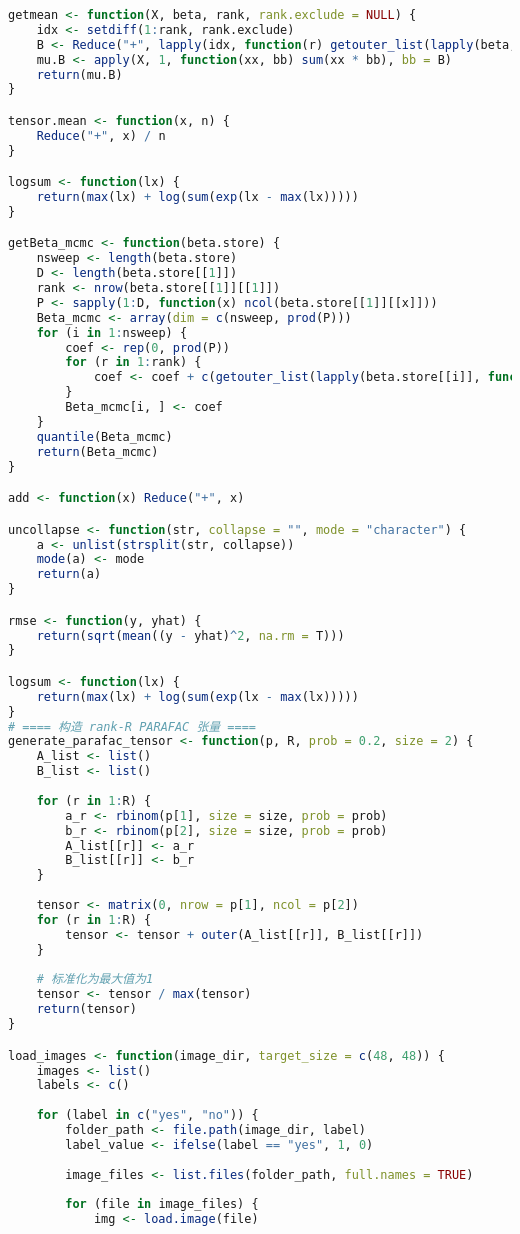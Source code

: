 \documentclass[AutoFakeBold]{LZUThesis}
\begin{document}
\begin{lstlisting}[language = R, caption = {BT-LR}算法]
getmean <- function(X, beta, rank, rank.exclude = NULL) {
	idx <- setdiff(1:rank, rank.exclude)
	B <- Reduce("+", lapply(idx, function(r) getouter_list(lapply(beta, function(x) x[r, ]))))
	mu.B <- apply(X, 1, function(xx, bb) sum(xx * bb), bb = B)
	return(mu.B)
}

tensor.mean <- function(x, n) {
	Reduce("+", x) / n
}

logsum <- function(lx) {
	return(max(lx) + log(sum(exp(lx - max(lx)))))
}

getBeta_mcmc <- function(beta.store) {
	nsweep <- length(beta.store)
	D <- length(beta.store[[1]])
	rank <- nrow(beta.store[[1]][[1]])
	P <- sapply(1:D, function(x) ncol(beta.store[[1]][[x]]))
	Beta_mcmc <- array(dim = c(nsweep, prod(P)))
	for (i in 1:nsweep) {
		coef <- rep(0, prod(P))
		for (r in 1:rank) {
			coef <- coef + c(getouter_list(lapply(beta.store[[i]], function(x) x[r, ])))
		}
		Beta_mcmc[i, ] <- coef
	}
	quantile(Beta_mcmc)
	return(Beta_mcmc)
}

add <- function(x) Reduce("+", x)

uncollapse <- function(str, collapse = "", mode = "character") {
	a <- unlist(strsplit(str, collapse))
	mode(a) <- mode
	return(a)
}

rmse <- function(y, yhat) {
	return(sqrt(mean((y - yhat)^2, na.rm = T)))
}

logsum <- function(lx) {
	return(max(lx) + log(sum(exp(lx - max(lx)))))
}
# ==== 构造 rank-R PARAFAC 张量 ====
generate_parafac_tensor <- function(p, R, prob = 0.2, size = 2) {
	A_list <- list()
	B_list <- list()
	
	for (r in 1:R) {
		a_r <- rbinom(p[1], size = size, prob = prob)
		b_r <- rbinom(p[2], size = size, prob = prob)
		A_list[[r]] <- a_r
		B_list[[r]] <- b_r
	}
	
	tensor <- matrix(0, nrow = p[1], ncol = p[2])
	for (r in 1:R) {
		tensor <- tensor + outer(A_list[[r]], B_list[[r]])
	}
	
	# 标准化为最大值为1
	tensor <- tensor / max(tensor)
	return(tensor)
}

load_images <- function(image_dir, target_size = c(48, 48)) {
	images <- list()
	labels <- c()
	
	for (label in c("yes", "no")) {
		folder_path <- file.path(image_dir, label)
		label_value <- ifelse(label == "yes", 1, 0)
		
		image_files <- list.files(folder_path, full.names = TRUE)
		
		for (file in image_files) {
			img <- load.image(file)
			

\end{lstlisting}
\end{document}
